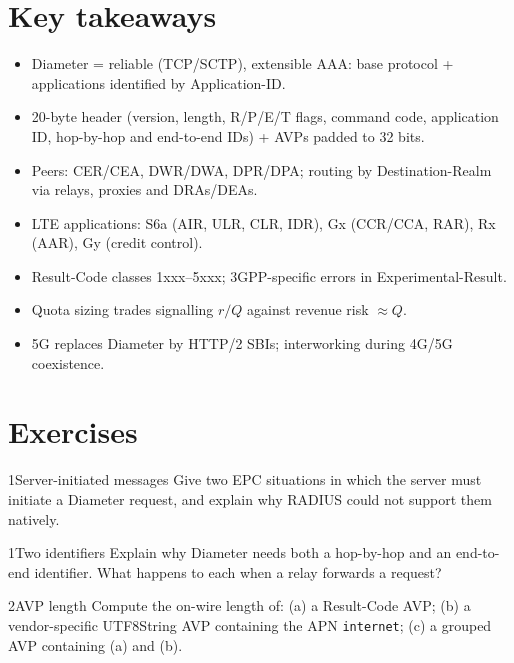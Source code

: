 \documentclass[11pt,a4paper]{article}
\begin{document}
\section{Key takeaways}
\begin{takeawaybox}
\begin{itemize}
  \item Diameter = reliable (TCP/SCTP), extensible AAA: base protocol + applications identified by
        Application-ID.
  \item 20-byte header (version, length, R/P/E/T flags, command code, application ID, hop-by-hop and
        end-to-end IDs) + AVPs padded to 32 bits.
  \item Peers: CER/CEA, DWR/DWA, DPR/DPA; routing by Destination-Realm via relays, proxies and DRAs/DEAs.
  \item LTE applications: S6a (AIR, ULR, CLR, IDR), Gx (CCR/CCA, RAR), Rx (AAR), Gy (credit control).
  \item Result-Code classes 1xxx--5xxx; 3GPP-specific errors in Experimental-Result.
  \item Quota sizing trades signalling $r/Q$ against revenue risk $\approx Q$.
  \item 5G replaces Diameter by HTTP/2 SBIs; interworking during 4G/5G coexistence.
\end{itemize}
\end{takeawaybox}

\section{Exercises}

\begin{exercisebox}{1}{Server-initiated messages}\label{exr:srv}
Give two EPC situations in which the server must initiate a Diameter request, and explain why RADIUS
could not support them natively.
\end{exercisebox}

\begin{exercisebox}{1}{Two identifiers}\label{exr:ids}
Explain why Diameter needs both a hop-by-hop and an end-to-end identifier. What happens to each when a relay
forwards a request?
\end{exercisebox}

\begin{exercisebox}{2}{AVP length}\label{exr:avp}
Compute the on-wire length of: (a) a Result-Code AVP; (b) a vendor-specific UTF8String AVP containing the APN
\texttt{internet}; (c) a grouped AVP containing (a) and (b).
\end{exercisebox}
\end{document}
